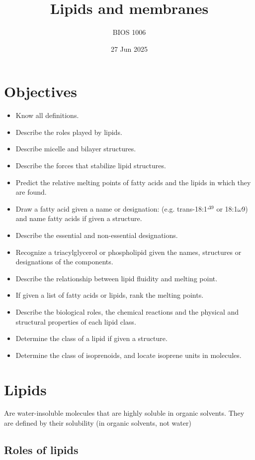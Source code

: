 \documentclass[letterpaper, 12pt]{article}
\title{Lipids and membranes}
\author{BIOS 1006}
\date{27 Jun 2025}
\begin{document}
\maketitle

\section*{Objectives}

\begin{itemize}
\item Know all definitions.
\item Describe the roles played by lipids.
\item Describe micelle and bilayer structures.
\item Describe the forces that stabilize lipid structures.
\item Predict the relative melting points of fatty acids and the lipids in which they are found.
\item Draw a fatty acid given a name or designation: (e.g. trans-18:1$^{\Delta 9}$ or 18:1$\omega$9) and name fatty acids if given a structure.
\item Describe the essential and non-essential designations.
\item Recognize a triacylglycerol or phospholipid given the names, structures or designations of the components.
\item Describe the relationship between lipid fluidity and melting point.
\item  If given a list of fatty acids or lipids, rank the melting points.
\item  Describe the biological roles, the chemical reactions and the physical and structural properties of each lipid class.
\item  Determine the class of a lipid if given a structure.
\item Determine the class of isoprenoids, and locate isoprene units in molecules.
\end{itemize}

\newpage

\section*{Lipids}
Are water-insoluble molecules that are highly soluble in organic solvents. They are defined by their solubility (in organic solvents, not water)

\subsection*{Roles of lipids}
\end{document}
